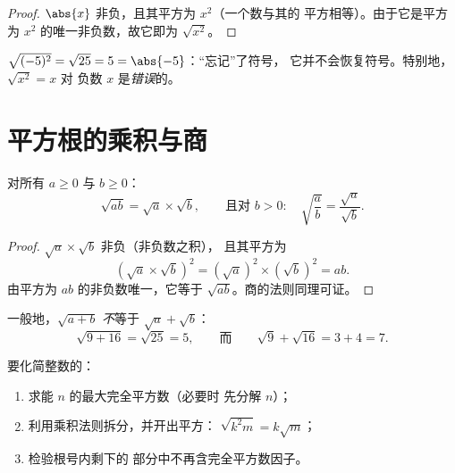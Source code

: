 \begin{proof}
$\abs{x}$ 非负，且其平方为 $x^2$（一个数与其的
平方相等）。由于它是平方为
$x^2$ 的唯一非负数，故它即为 $\sqrt{x^2}$。
\end{proof}

\begin{example}
$\sqrt{(-5)^2} = \sqrt{25} = 5 = \abs{-5}$：“忘记”了符号，
它并不会恢复符号。特别地，$\sqrt{x^2} = x$ 对
负数 $x$ 是\emph{错误}的。
\end{example}

\section{平方根的乘积与商}

\begin{theorem}[乘法与除法法则]\label{thm:g9:sqrt:rules}
对所有 $a \geq 0$ 与 $b \geq 0$：
\[
\sqrt{a b} = \sqrt a \times \sqrt b,
\qquad\text{且对 } b > 0:\quad
\sqrt{\frac ab} = \frac{\sqrt a}{\sqrt b} .
\]
\end{theorem}

\begin{proof}
$\sqrt a \times \sqrt b$ 非负（非负数之积），
且其平方为
\[
\left(\sqrt a \times \sqrt b\right)^2
= \left(\sqrt a\right)^2 \times \left(\sqrt b\right)^2
= a b .
\]
由平方为 $ab$ 的非负数唯一，它等于
$\sqrt{ab}$。商的法则同理可证。
\end{proof}

\begin{remark}[和的情形没有此法则！]
一般地，$\sqrt{a + b}$ \emph{不}等于 $\sqrt a + \sqrt b$：
\[
\sqrt{9 + 16} = \sqrt{25} = 5,
\qquad\text{而}\qquad
\sqrt 9 + \sqrt{16} = 3 + 4 = 7 .
\]
\end{remark}

\begin{method}[化简 $\sqrt n$]\label{met:g9:sqrt:simplify}
要化简整数的：
\begin{enumerate}
  \item 求能 $n$ 的最大完全平方数（必要时
        先分解 $n$）；
  \item 利用乘积法则拆分，并开出平方：
        $\sqrt{k^2 m} = k\sqrt m$；
  \item 检验根号内剩下的
        部分中不再含完全平方数因子。
\end{enumerate}
\end{method}

